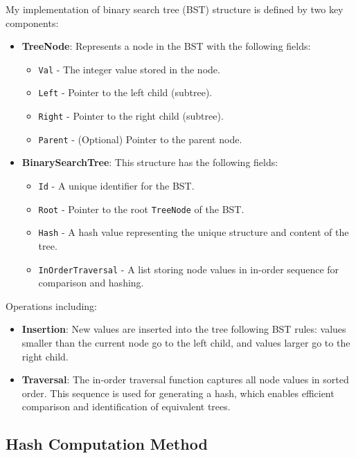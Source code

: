 \documentclass[letterpaper,12pt]{article}
\theoremstyle{remark}
\begin{document}
My implementation of binary search tree (BST) structure is defined by two key components:

\begin{itemize}
    \item \textbf{TreeNode}: Represents a node in the BST with the following fields:
    \begin{itemize}
        \item \texttt{Val} - The integer value stored in the node.
        \item \texttt{Left} - Pointer to the left child (subtree).
        \item \texttt{Right} - Pointer to the right child (subtree).
        \item \texttt{Parent} - (Optional) Pointer to the parent node.
    \end{itemize}
    
    \item \textbf{BinarySearchTree}: This structure has the following fields:
    \begin{itemize}
        \item \texttt{Id} - A unique identifier for the BST.
        \item \texttt{Root} - Pointer to the root \texttt{TreeNode} of the BST.
        \item \texttt{Hash} - A hash value representing the unique structure and content of the tree.
        \item \texttt{InOrderTraversal} - A list storing node values in in-order sequence for comparison and hashing.
    \end{itemize}
\end{itemize}
Operations including:
\begin{itemize}
    \item \textbf{Insertion}: New values are inserted into the tree following BST rules: values smaller than the current node go to the left child, and values larger go to the right child.
    
    \item \textbf{Traversal}: The in-order traversal function captures all node values in sorted order. This sequence is used for generating a hash, which enables efficient comparison and identification of equivalent trees.
\end{itemize}

\subsection{Hash Computation Method}
\end{document}
